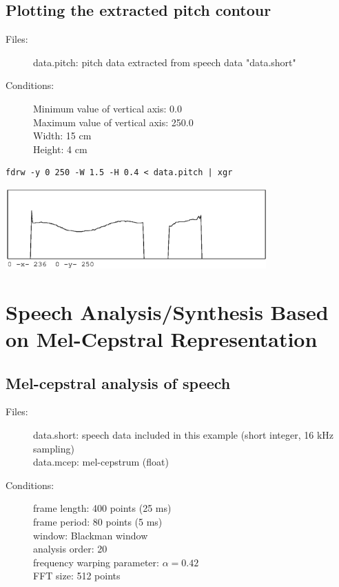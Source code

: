 \documentclass[a4paper,10pt]{article}
\begin{document}
\subsection{Plotting the extracted pitch contour}

\begin{description}
\item[Files:]
  data.pitch: pitch data extracted from speech data "data.short"
\item[Conditions:]
  Minimum value of vertical axis: 0.0\\
  Maximum value of vertical axis: 250.0\\
  Width: 15 cm\\
  Height: 4 cm
\end{description}

\begin{verbatim}
fdrw -y 0 250 -W 1.5 -H 0.4 < data.pitch | xgr
\end{verbatim}

\includegraphics[width=10cm]{eps/data.pitch.fdrw.eps}

\section{Speech Analysis/Synthesis Based on Mel-Cepstral Representation}

\subsection{Mel-cepstral analysis of speech}

\begin{description}
\item[Files:]
  data.short: speech data included in this example (short integer, 16 kHz sampling)\\
  data.mcep: mel-cepstrum (float)
\item[Conditions:]
  frame length: 400 points (25 ms)\\
  frame period: 80 points (5 ms)\\
  window: Blackman window\\
  analysis order: 20\\
  frequency warping parameter: $\alpha = 0.42$\\
  FFT size: 512 points
\end{description}
\end{document}
